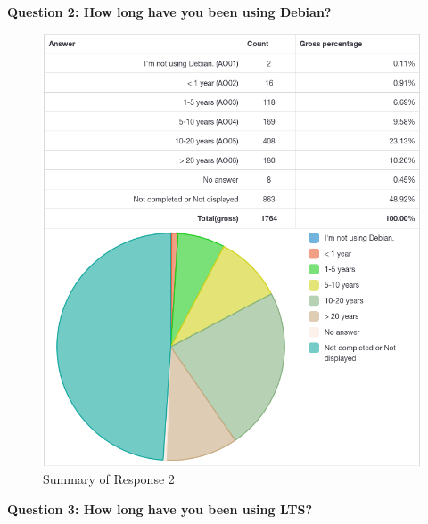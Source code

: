 \documentclass{article}
\begin{document}
\newpage

\Large{\textbf{Question 2: How long have you been using Debian?}}

\vspace{3mm}
\begin{figure}[h!]
\centering
\includegraphics[width=16.5cm]{assets/2-summary.png}
\caption{Summary of Response 2}
\end{figure}

\newpage

\Large{\textbf{Question 3: How long have you been using LTS?}}
\end{document}
